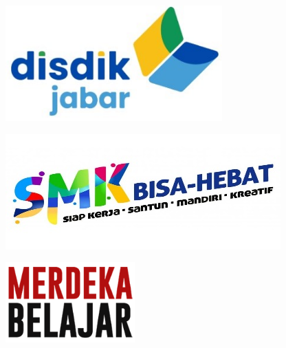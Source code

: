 \documentclass{article}
\begin{document}
\vspace{10mm} 

\begin{minipage}{.33\textwidth}
  \centering
    \includegraphics{assets/disdik_jabar.png}
\end{minipage}
\begin{minipage}{.33\textwidth}
  \centering
    \includegraphics{assets/smk.jpg}
\end{minipage}
\begin{minipage}{.33\textwidth}
  \centering
    \includegraphics{assets/merdeka_belajar.png}
\end{minipage}

\vspace{10mm} 
\end{document}
